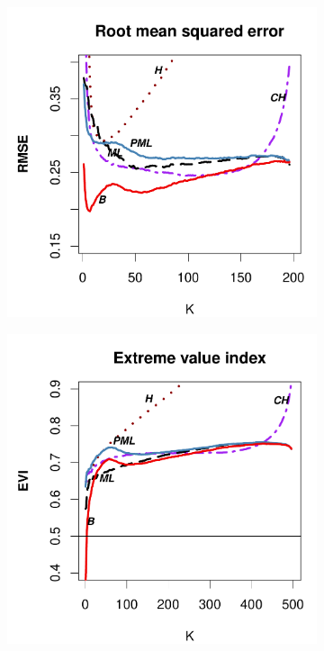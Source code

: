 \begin{figure}[h]
\begin{subfigure}[h]{0.40\linewidth}
			\includegraphics[width=\textwidth]{./plots/paper1/RMSE_Outputloggamma0,5200.pdf}
		\end{subfigure}
		\bigskip
		\centering
		\begin{subfigure}[h]{0.40\linewidth}
			\includegraphics[width=\textwidth]{./plots/paper1/EVI_Outputloggamma0,5500.pdf}

\end{subfigure}
\end{figure}
